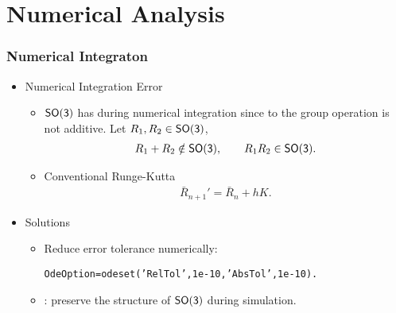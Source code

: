 \section*{Numerical Analysis}
\begin{frame} %
\frametitle{Numerical Integraton}
\begin{itemize} 
\item Numerical Integration Error
	\begin{itemize} 
	\item $\mathsf{SO(3)}$ has  during numerical integration since to the group operation is not additive. Let $R_1,R_2\in\mathsf{SO(3)}$,
		{\small\begin{gather*}
		R_1+R_2\notin\mathsf{SO(3)},\qquad R_1R_2\in\mathsf{SO(3)}.
		\end{gather*}}	
	\item Conventional Runge-Kutta
		{\small\begin{gather*}
		\bar{R}_{n+1}'=\bar{R}_{n}+hK.
		\end{gather*}}				
	\end{itemize}
\pause	
\item Solutions
	\begin{itemize}
	\item Reduce error tolerance numerically: \\
	\begin{alltt}
	{\scriptsize OdeOption=odeset('RelTol',1e-10,'AbsTol',1e-10)}.
	\end{alltt}
	\item {}: preserve the structure of $\mathsf{SO(3)}$ during simulation.
	\end{itemize} 
\end{itemize} 		
\end{frame}   %


